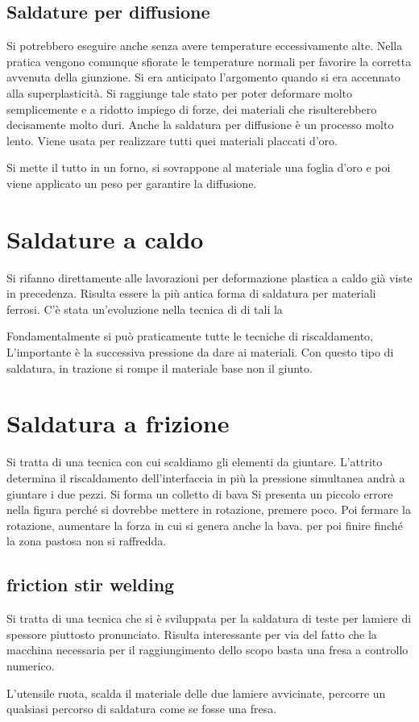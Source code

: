 \subsection{Saldature per diffusione}
Si potrebbero eseguire anche senza avere temperature eccessivamente alte. Nella pratica vengono comunque sfiorate le temperature normali per favorire la corretta avvenuta della giunzione.
Si era anticipato l'argomento quando si era accennato alla superplasticità.
Si raggiunge tale stato per poter deformare molto semplicemente e a ridotto impiego di forze, dei materiali che risulterebbero decisamente molto duri.
Anche la saldatura per diffusione è un processo molto lento.
Viene usata per realizzare tutti quei materiali placcati d'oro.

Si mette il tutto in un forno, si sovrappone al materiale una foglia d'oro e poi viene applicato un peso per garantire la diffusione.


\section{Saldature a caldo}
Si rifanno direttamente alle lavorazioni per deformazione plastica a caldo già viste in precedenza.
Risulta essere la più antica forma di saldatura per materiali ferrosi.
C'è stata un'evoluzione nella tecnica di di tali la\todo{\\Aggiungi}

Fondamentalmente si può praticamente tutte le tecniche di riscaldamento, L'importante è la successiva pressione da dare ai materiali.
Con questo tipo di saldatura, in trazione si rompe il materiale base non il giunto.

\section{Saldatura a frizione}
Si tratta di una tecnica con cui scaldiamo gli elementi da giuntare.
L'attrito determina il riscaldamento dell'interfaccia in più la pressione simultanea andrà a giuntare i due pezzi. Si forma un colletto di bava
Si presenta un piccolo errore nella figura perché si dovrebbe mettere in rotazione, premere poco.
Poi fermare la rotazione, aumentare la forza in cui si genera anche la bava. 
per poi finire finché la zona pastosa non si raffredda.

\subsection{friction stir welding}
Si tratta di una tecnica che si è sviluppata per la saldatura di teste per lamiere di spessore piuttosto pronunciato. 
Risulta interessante per via del fatto che la macchina necessaria per il raggiungimento dello scopo basta una fresa a controllo numerico.

L'utensile ruota, scalda il materiale delle due lamiere avvicinate, percorre un qualsiasi percorso di saldatura come se fosse una fresa. 